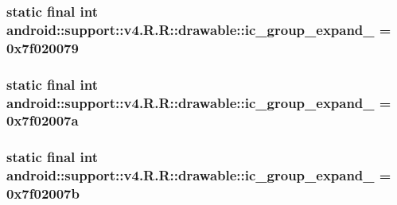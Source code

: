 \hypertarget{classandroid_1_1support_1_1v4_1_1_r_1_1drawable_e6253cf4176b2126c5c976763eb8b206}{
\subsubsection[{ic\_\-group\_\-expand\_\-10}]{\setlength{\rightskip}{0pt plus 5cm}static final int android::support::v4.R.R::drawable::ic\_\-group\_\-expand\_ = 0x7f020079}}
\label{classandroid_1_1support_1_1v4_1_1_r_1_1drawable_e6253cf4176b2126c5c976763eb8b206}


\hypertarget{classandroid_1_1support_1_1v4_1_1_r_1_1drawable_09549bb2467aaf894bb409beaf3546b9}{
\subsubsection[{ic\_\-group\_\-expand\_\-11}]{\setlength{\rightskip}{0pt plus 5cm}static final int android::support::v4.R.R::drawable::ic\_\-group\_\-expand\_ = 0x7f02007a}}
\label{classandroid_1_1support_1_1v4_1_1_r_1_1drawable_09549bb2467aaf894bb409beaf3546b9}


\hypertarget{classandroid_1_1support_1_1v4_1_1_r_1_1drawable_c4d048fd9f88b86e0f479ff1e17da2d3}{
\subsubsection[{ic\_\-group\_\-expand\_\-12}]{\setlength{\rightskip}{0pt plus 5cm}static final int android::support::v4.R.R::drawable::ic\_\-group\_\-expand\_ = 0x7f02007b}}
\label{classandroid_1_1support_1_1v4_1_1_r_1_1drawable_c4d048fd9f88b86e0f479ff1e17da2d3}


